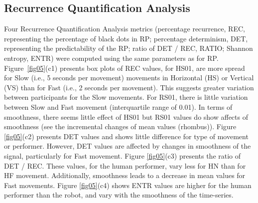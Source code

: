 \documentclass[fleqn,10pt]{wlscirep}
\begin{document}
\subsection*{Recurrence Quantification Analysis} \label{ch6:rqas}
Four Recurrence Quantification Analysis metrics (percentage recurrence, REC, representing the percentage of black dots in RP; percentage determinism, DET, representing the predictability of the RP; ratio of DET / REC, RATIO; Shannon entropy, ENTR) were computed using the same parameters as for RP.
Figure~\ref{fig05}(c1) presents box plots of REC values, for HS01, are more spread for Slow (i.e., 5 seconds per movement) movements in Horizontal (HS) or Vertical (VS) than for Fast (i.e., 2 seconds per movement).
This suggests greater variation between participants for the Slow movements.  
For RS01, there is little variation between Slow and Fast movement (interquartile range of 0.01).
In terms of smoothness, there seems little effect of HS01 but RS01 values do show affects of smoothness (see the incremental changes of mean values (rhombus)).
Figure \ref{fig05}(c2) presents DET values and shows little difference for type of movement or performer.
However, DET values are affected by changes in smoothness of the signal, particularly for Fast movement.
Figure \ref{fig05}(c3) presents the ratio of DET / REC.
These values, for the human performer, vary less for HN than for HF movement.  
Additionally, smoothness leads to a decrease in mean values for Fast movements.
Figure \ref{fig05}(c4) shows ENTR values are higher for the human
performer than the robot, and vary with the smoothness of the time-series.
\end{document}
